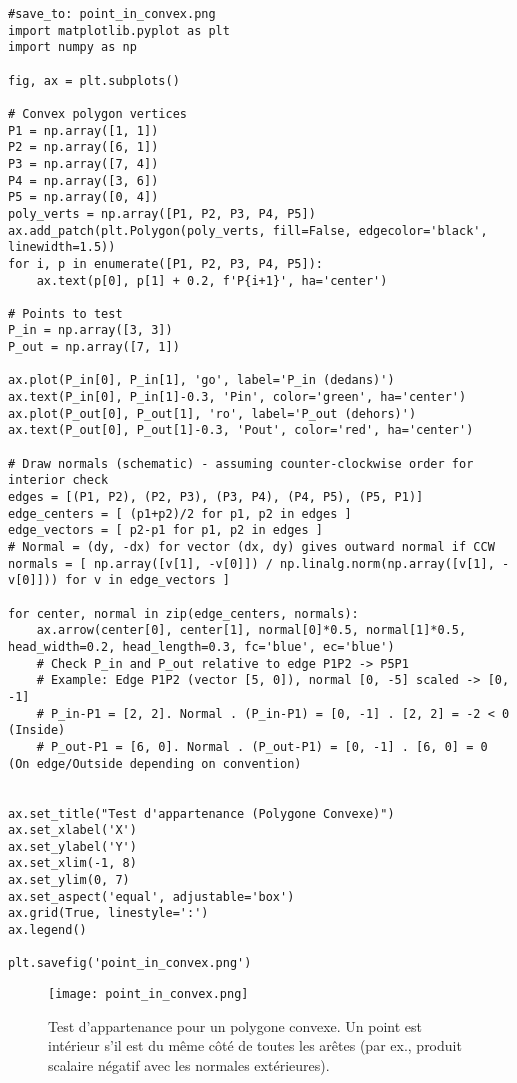 \documentclass{article}
\begin{document}
\begin{verbatim}
#save_to: point_in_convex.png
import matplotlib.pyplot as plt
import numpy as np

fig, ax = plt.subplots()

# Convex polygon vertices
P1 = np.array([1, 1])
P2 = np.array([6, 1])
P3 = np.array([7, 4])
P4 = np.array([3, 6])
P5 = np.array([0, 4])
poly_verts = np.array([P1, P2, P3, P4, P5])
ax.add_patch(plt.Polygon(poly_verts, fill=False, edgecolor='black', linewidth=1.5))
for i, p in enumerate([P1, P2, P3, P4, P5]):
    ax.text(p[0], p[1] + 0.2, f'P{i+1}', ha='center')

# Points to test
P_in = np.array([3, 3])
P_out = np.array([7, 1])

ax.plot(P_in[0], P_in[1], 'go', label='P_in (dedans)')
ax.text(P_in[0], P_in[1]-0.3, 'Pin', color='green', ha='center')
ax.plot(P_out[0], P_out[1], 'ro', label='P_out (dehors)')
ax.text(P_out[0], P_out[1]-0.3, 'Pout', color='red', ha='center')

# Draw normals (schematic) - assuming counter-clockwise order for interior check
edges = [(P1, P2), (P2, P3), (P3, P4), (P4, P5), (P5, P1)]
edge_centers = [ (p1+p2)/2 for p1, p2 in edges ]
edge_vectors = [ p2-p1 for p1, p2 in edges ]
# Normal = (dy, -dx) for vector (dx, dy) gives outward normal if CCW
normals = [ np.array([v[1], -v[0]]) / np.linalg.norm(np.array([v[1], -v[0]])) for v in edge_vectors ]

for center, normal in zip(edge_centers, normals):
    ax.arrow(center[0], center[1], normal[0]*0.5, normal[1]*0.5, head_width=0.2, head_length=0.3, fc='blue', ec='blue')
    # Check P_in and P_out relative to edge P1P2 -> P5P1
    # Example: Edge P1P2 (vector [5, 0]), normal [0, -5] scaled -> [0, -1]
    # P_in-P1 = [2, 2]. Normal . (P_in-P1) = [0, -1] . [2, 2] = -2 < 0 (Inside)
    # P_out-P1 = [6, 0]. Normal . (P_out-P1) = [0, -1] . [6, 0] = 0 (On edge/Outside depending on convention)


ax.set_title("Test d'appartenance (Polygone Convexe)")
ax.set_xlabel('X')
ax.set_ylabel('Y')
ax.set_xlim(-1, 8)
ax.set_ylim(0, 7)
ax.set_aspect('equal', adjustable='box')
ax.grid(True, linestyle=':')
ax.legend()

plt.savefig('point_in_convex.png')
\end{verbatim}

\begin{figure}[H]
\centering
\texttt{[image: point\_in\_convex.png]}
\caption{Test d'appartenance pour un polygone convexe. Un point est intérieur s'il est du même côté de toutes les arêtes (par ex., produit scalaire négatif avec les normales extérieures).}
\label{fig:point_in_convex}
\end{figure}
\end{document}
